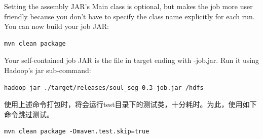 \par Setting the assembly JAR's Main class is optional, but makes the job more user friendly because you don’t have to specify the class name explicitly for each run. You can now build your job JAR:
\begin{verbatim}
mvn clean package
\end{verbatim}
\par Your self-contained job JAR is the file in target ending with -job.jar. Run it using Hadoop’s jar sub-command: 
\begin{verbatim}
hadoop jar ./target/releases/soul_seg-0.3-job.jar /hdfs
\end{verbatim}
\par 使用上述命令打包时，将会运行test目录下的测试类，十分耗时。为此，使用如下命令跳过测试。
\begin{verbatim}
mvn clean package -Dmaven.test.skip=true
\end{verbatim}
